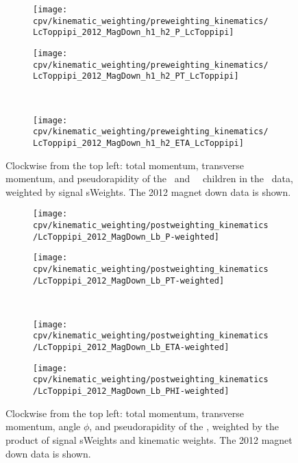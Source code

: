 \begin{figure}
  \begin{subfigure}[b]{0.5\textwidth}
    \centering
    \texttt{[image: cpv/kinematic\_weighting/preweighting\_kinematics/LcToppipi\_2012\_MagDown\_h1\_h2\_P\_LcToppipi]}
    \label{fig:cpv:kinematic_weighting:pre:ppipi_h1h2:P}
  \end{subfigure}
  \begin{subfigure}[b]{0.5\textwidth}
    \centering
    \texttt{[image: cpv/kinematic\_weighting/preweighting\_kinematics/LcToppipi\_2012\_MagDown\_h1\_h2\_PT\_LcToppipi]}
    \label{fig:cpv:kinematic_weighting:pre:ppipi_h1h2:PT}
  \end{subfigure}\\
  \begin{subfigure}[b]{\textwidth}
    \centering
    \texttt{[image: cpv/kinematic\_weighting/preweighting\_kinematics/LcToppipi\_2012\_MagDown\_h1\_h2\_ETA\_LcToppipi]}
    \label{fig:cpv:kinematic_weighting:pre:ppipi_h1h2:ETA}
  \end{subfigure}
  \caption{%
    Clockwise from the top left: total momentum, transverse momentum, and 
    pseudorapidity of the \Ppiminus\ and \Ppiplus\ \PLambdac\ children in the 
    \ppipi\ data, weighted by signal sWeights.
    The 2012 magnet down data is shown.
  }
  \label{fig:cpv:kinematic_weighting:pre:ppipi_h1h2}
\end{figure}

\begin{figure}
  \begin{subfigure}[b]{0.4\textwidth}
    \texttt{[image: cpv/kinematic\_weighting/postweighting\_kinematics/LcToppipi\_2012\_MagDown\_Lb\_P-weighted]}
    \label{fig:cpv:kinematic_weighting:post:Lb:P}
  \end{subfigure}
  \begin{subfigure}[b]{0.4\textwidth}
    \texttt{[image: cpv/kinematic\_weighting/postweighting\_kinematics/LcToppipi\_2012\_MagDown\_Lb\_PT-weighted]}
    \label{fig:cpv:kinematic_weighting:post:Lb:PT}
  \end{subfigure}\\
  \begin{subfigure}[b]{0.4\textwidth}
    \texttt{[image: cpv/kinematic\_weighting/postweighting\_kinematics/LcToppipi\_2012\_MagDown\_Lb\_ETA-weighted]}
    \label{fig:cpv:kinematic_weighting:post:Lb:ETA}
  \end{subfigure}
  \begin{subfigure}[b]{0.4\textwidth}
    \texttt{[image: cpv/kinematic\_weighting/postweighting\_kinematics/LcToppipi\_2012\_MagDown\_Lb\_PHI-weighted]}
    \label{fig:cpv:kinematic_weighting:post:Lb:PHI}
  \end{subfigure}
  \caption{%
    Clockwise from the top left: total momentum, transverse momentum, angle 
    $\phi$, and pseudorapidity of the \PLambdab, weighted by the product of 
    signal sWeights and kinematic weights.
    The 2012 magnet down data is shown.
  }
  \label{fig:cpv:kinematic_weighting:post:Lb}
\end{figure}

